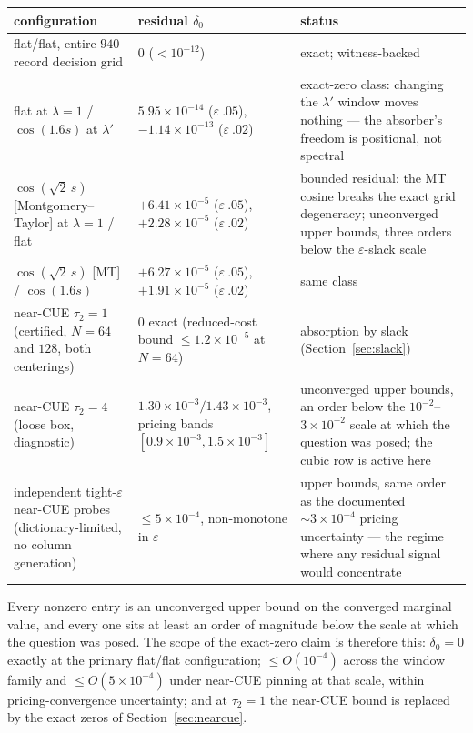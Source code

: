\documentclass[11pt]{article}
\theoremstyle{plain}
\theoremstyle{definition}
\theoremstyle{remark}
\begin{document}
\begin{table}[h]
\centering
\small
\begin{tabular}{@{}>{\raggedright\arraybackslash}p{4.0cm}
                  >{\raggedright\arraybackslash}p{3.7cm}
                  >{\raggedright\arraybackslash}p{6.3cm}@{}}
\toprule
configuration & residual $\delta_0$ & status \\
\midrule
flat/flat, entire $940$-record decision grid & $0$ ($< 10^{-12}$) &
exact; witness-backed \\
\addlinespace
flat at $\lambda = 1$ / $\cos(1.6 s)$ at $\lambda'$ &
$5.95 \times 10^{-14}$ ($\varepsilon\ .05$),
$-1.14 \times 10^{-13}$ ($\varepsilon\ .02$) &
exact-zero class: changing the $\lambda'$ window moves nothing --- the
absorber's freedom is positional, not spectral \\
\addlinespace
$\cos(\sqrt{2}\, s)$ [Montgomery--Taylor] at $\lambda = 1$ / flat &
$+6.41 \times 10^{-5}$ ($\varepsilon\ .05$),
$+2.28 \times 10^{-5}$ ($\varepsilon\ .02$) &
bounded residual: the MT cosine breaks the exact grid degeneracy; unconverged
upper bounds, three orders below the $\varepsilon$-slack scale \\
\addlinespace
$\cos(\sqrt{2}\, s)$ [MT] / $\cos(1.6 s)$ &
$+6.27 \times 10^{-5}$ ($\varepsilon\ .05$),
$+1.91 \times 10^{-5}$ ($\varepsilon\ .02$) & same class \\
\addlinespace
near-CUE $\tau_2 = 1$ (certified, $N = 64$ and $128$, both centerings) &
$0$ exact (reduced-cost bound $\le 1.2 \times 10^{-5}$ at $N = 64$) &
absorption by slack (Section~\ref{sec:slack}) \\
\addlinespace
near-CUE $\tau_2 = 4$ (loose box, diagnostic) &
$1.30 \times 10^{-3} / 1.43 \times 10^{-3}$, pricing bands
$[0.9 \times 10^{-3}, 1.5 \times 10^{-3}]$ &
unconverged upper bounds, an order below the $10^{-2}$--$3 \times 10^{-2}$
scale at which the question was posed; the cubic row is active here \\
\addlinespace
independent tight-$\varepsilon$ near-CUE probes (dictionary-limited, no column
generation) & $\le 5 \times 10^{-4}$, non-monotone in $\varepsilon$ &
upper bounds, same order as the documented ${\sim}3 \times 10^{-4}$ pricing
uncertainty --- the regime where any residual signal would concentrate \\
\bottomrule
\end{tabular}
\end{table}

Every nonzero entry is an unconverged upper bound on the converged marginal
value, and every one sits at least an order of magnitude below the scale at
which the question was posed. The scope of the exact-zero claim is therefore
this: $\delta_0 = 0$
exactly at the primary flat/flat configuration; $\le O(10^{-4})$ across the
window family and $\le O(5 \times 10^{-4})$ under near-CUE pinning at that scale,
within pricing-convergence uncertainty; and at $\tau_2 = 1$ the near-CUE bound
is replaced by the exact zeros of Section~\ref{sec:nearcue}.
\end{document}
